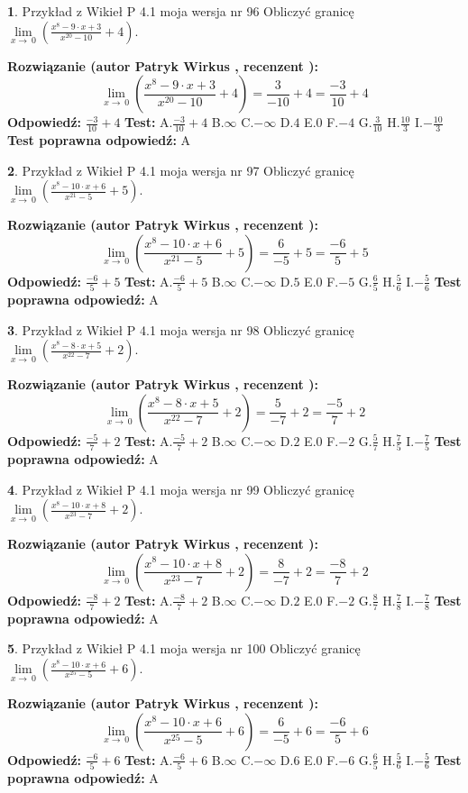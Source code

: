\documentclass[12pt, a4paper]{article}
\theoremstyle{definition} %
\newtheorem{zad}{}
\newcommand{\zadStart}[1]{\begin{zad}#1\newline}
\newcommand{\zadStop}{\end{zad}}
\newcommand{\rozwStart}[2]{\noindent \textbf{Rozwiązanie (autor #1 , recenzent #2): }\newline}
\newcommand{\rozwStop}{\newline}
\newcommand{\odpStart}{\noindent \textbf{Odpowiedź:}\newline}
\newcommand{\odpStop}{\newline}
\newcommand{\testStart}{\noindent \textbf{Test:}\newline}
\newcommand{\testStop}{\newline}
\newcommand{\kluczStart}{\noindent \textbf{Test poprawna odpowiedź:}\newline}
\newcommand{\kluczStop}{\newline}
\begin{document}
\zadStart{Przykład z Wikieł P 4.1 moja wersja nr 96}
Obliczyć granicę $\lim\limits_{x\to\ 0}(\frac{x^{8}-9 \cdot x +3}{x^{20}-10}+4)$.
\zadStop
\rozwStart{Patryk Wirkus}{}
$$\lim\limits_{x\to\ 0}(\frac{x^{8}-9 \cdot x +3}{x^{20}-10}+4)=\frac{3}{-10}+4=\frac{-3}{10}+4$$
\rozwStop
\odpStart
$\frac{-3}{10}+4$
\odpStop
\testStart
A.$\frac{-3}{10}+4$
B.$\infty$
C.$-\infty$
D.$4$
E.$0$
F.$-4$
G.$\frac{3}{10}$
H.$\frac{10}{3}$
I.$-\frac{10}{3}$
\testStop
\kluczStart
A
\kluczStop



\zadStart{Przykład z Wikieł P 4.1 moja wersja nr 97}
Obliczyć granicę $\lim\limits_{x\to\ 0}(\frac{x^{8}-10 \cdot x +6}{x^{21}-5}+5)$.
\zadStop
\rozwStart{Patryk Wirkus}{}
$$\lim\limits_{x\to\ 0}(\frac{x^{8}-10 \cdot x +6}{x^{21}-5}+5)=\frac{6}{-5}+5=\frac{-6}{5}+5$$
\rozwStop
\odpStart
$\frac{-6}{5}+5$
\odpStop
\testStart
A.$\frac{-6}{5}+5$
B.$\infty$
C.$-\infty$
D.$5$
E.$0$
F.$-5$
G.$\frac{6}{5}$
H.$\frac{5}{6}$
I.$-\frac{5}{6}$
\testStop
\kluczStart
A
\kluczStop



\zadStart{Przykład z Wikieł P 4.1 moja wersja nr 98}
Obliczyć granicę $\lim\limits_{x\to\ 0}(\frac{x^{8}-8 \cdot x +5}{x^{22}-7}+2)$.
\zadStop
\rozwStart{Patryk Wirkus}{}
$$\lim\limits_{x\to\ 0}(\frac{x^{8}-8 \cdot x +5}{x^{22}-7}+2)=\frac{5}{-7}+2=\frac{-5}{7}+2$$
\rozwStop
\odpStart
$\frac{-5}{7}+2$
\odpStop
\testStart
A.$\frac{-5}{7}+2$
B.$\infty$
C.$-\infty$
D.$2$
E.$0$
F.$-2$
G.$\frac{5}{7}$
H.$\frac{7}{5}$
I.$-\frac{7}{5}$
\testStop
\kluczStart
A
\kluczStop



\zadStart{Przykład z Wikieł P 4.1 moja wersja nr 99}
Obliczyć granicę $\lim\limits_{x\to\ 0}(\frac{x^{8}-10 \cdot x +8}{x^{23}-7}+2)$.
\zadStop
\rozwStart{Patryk Wirkus}{}
$$\lim\limits_{x\to\ 0}(\frac{x^{8}-10 \cdot x +8}{x^{23}-7}+2)=\frac{8}{-7}+2=\frac{-8}{7}+2$$
\rozwStop
\odpStart
$\frac{-8}{7}+2$
\odpStop
\testStart
A.$\frac{-8}{7}+2$
B.$\infty$
C.$-\infty$
D.$2$
E.$0$
F.$-2$
G.$\frac{8}{7}$
H.$\frac{7}{8}$
I.$-\frac{7}{8}$
\testStop
\kluczStart
A
\kluczStop



\zadStart{Przykład z Wikieł P 4.1 moja wersja nr 100}
Obliczyć granicę $\lim\limits_{x\to\ 0}(\frac{x^{8}-10 \cdot x +6}{x^{25}-5}+6)$.
\zadStop
\rozwStart{Patryk Wirkus}{}
$$\lim\limits_{x\to\ 0}(\frac{x^{8}-10 \cdot x +6}{x^{25}-5}+6)=\frac{6}{-5}+6=\frac{-6}{5}+6$$
\rozwStop
\odpStart
$\frac{-6}{5}+6$
\odpStop
\testStart
A.$\frac{-6}{5}+6$
B.$\infty$
C.$-\infty$
D.$6$
E.$0$
F.$-6$
G.$\frac{6}{5}$
H.$\frac{5}{6}$
I.$-\frac{5}{6}$
\testStop
\kluczStart
A
\kluczStop
\end{document}
